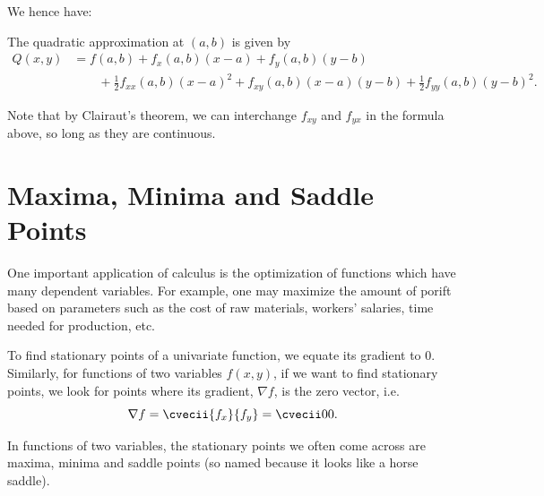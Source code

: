 We hence have:
\begin{proposition}
    The quadratic approximation at $(a, b)$ is given by
    \begin{align*}
        Q(x, y) &= f(a, b) + f_x(a, b) (x-a) + f_y(a, b) (y-b)\\
        &\hspace{2em} + \frac12 f_{xx}(a,b) (x-a)^2 + f_{xy}(a, b) (x-a)(y-b) + \frac12 f_{yy}(a, b) (y-b)^2.
    \end{align*}
\end{proposition}

Note that by Clairaut's theorem, we can interchange $f_{xy}$ and $f_{yx}$ in the formula above, so long as they are continuous.

\section{Maxima, Minima and Saddle Points}

One important application of calculus is the optimization of functions which have many dependent variables. For example, one may maximize the amount of porift based on parameters such as the cost of raw materials, workers' salaries, time needed for production, etc.

To find stationary points of a univariate function, we equate its gradient to 0. Similarly, for functions of two variables $f(x, y)$, if we want to find stationary points, we look for points where its gradient, $\nabla f$, is the zero vector, i.e. \[\nabla f = \cvecii{f_x}{f_y} = \cvecii00.\]

In functions of two variables, the stationary points we often come across are maxima, minima and saddle points (so named because it looks like a horse saddle).

